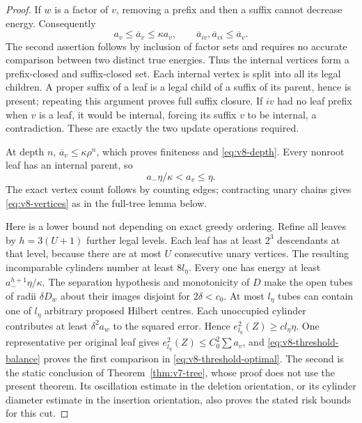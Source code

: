 \begin{proof}
If $w$ is a factor of $v$, removing a prefix and then a suffix cannot
decrease energy. Consequently
\begin{equation}
 a_v\le\overline a_v\le\kappa a_v,
 \qquad \overline a_{iv},\overline a_{vi}\le\overline a_v.
                                                        \label{eq:v8-envelopebounds}
\end{equation}
The second assertion follows by inclusion of factor sets and requires
no accurate comparison between two distinct true energies. Thus the
internal vertices form a prefix-closed and suffix-closed set. Each
internal vertex is split into all its legal children. A proper suffix
of a leaf is a legal child of a suffix of its parent, hence is present;
repeating this argument proves full suffix closure. If $iv$ had no
leaf prefix when $v$ is a leaf, it would be internal, forcing its suffix
$v$ to be internal, a contradiction. These are exactly the two update
operations required.

At depth $n$, $\overline a_v\le\kappa\rho^n$, which proves finiteness
and \eqref{eq:v8-depth}. Every nonroot leaf has an internal parent, so
\begin{equation}
                  a_-\eta/\kappa<a_v\le\eta.          \label{eq:v8-threshold-balance}
\end{equation}
The exact vertex count follows by counting edges; contracting unary
chains gives \eqref{eq:v8-vertices} as in the full-tree lemma below.

Here is a lower bound not depending on exact greedy ordering. Refine
all leaves by $h=3(U+1)$ further legal levels. Each leaf has at least
$2^3$ descendants at that level, because there are at most $U$
consecutive unary vertices. The resulting incomparable cylinders
number at least $8l_\eta$. Every one has energy at least
$a_-^{h+1}\eta/\kappa$. The separation hypothesis and monotonicity of
$D$ make the open tubes of radii $\delta D_w$ about their images
disjoint for $2\delta<c_0$. At most $l_\eta$ tubes can contain one of
$l_\eta$ arbitrary proposed Hilbert centres. Each unoccupied cylinder
contributes at least $\delta^2a_w$ to the squared error. Hence
$e_{l_\eta}^2(Z)\ge c l_\eta\eta$. One representative per original leaf
gives $e_{l_\eta}^2(Z)\le C_0^2\sum a_v$, and
\eqref{eq:v8-threshold-balance} proves the first comparison in
\eqref{eq:v8-threshold-optimal}. The second is the static conclusion of
Theorem~\ref{thm:v7-tree}, whose proof does not use the present theorem.
Its oscillation estimate in the deletion orientation, or its cylinder
diameter estimate in the insertion orientation, also proves the stated
risk bounds for this cut.


\end{proof}

